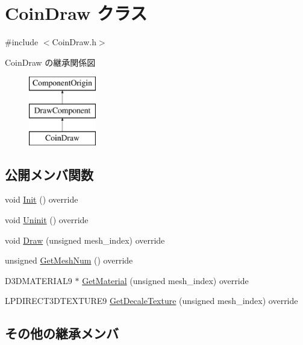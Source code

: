 \hypertarget{class_coin_draw}{}\section{Coin\+Draw クラス}
\label{class_coin_draw}


{\ttfamily \#include $<$Coin\+Draw.\+h$>$}

Coin\+Draw の継承関係図\begin{figure}[H]
\begin{center}
\leavevmode
\includegraphics[height=3.000000cm]{class_coin_draw}
\end{center}
\end{figure}
\subsection*{公開メンバ関数}
\begin{DoxyCompactItemize}
\item 
void \mbox{\hyperlink{class_coin_draw_ad0f5da5cfb896541fd59b1ab4a8593d1}{Init}} () override
\item 
void \mbox{\hyperlink{class_coin_draw_a6484c22a5598e298f18e7cd6083cd551}{Uninit}} () override
\item 
void \mbox{\hyperlink{class_coin_draw_a57e3f327324db9ec3debc702d14325c7}{Draw}} (unsigned mesh\+\_\+index) override
\item 
unsigned \mbox{\hyperlink{class_coin_draw_a9f5aa847fcb28e5617f00d575a6a911c}{Get\+Mesh\+Num}} () override
\item 
D3\+D\+M\+A\+T\+E\+R\+I\+A\+L9 $\ast$ \mbox{\hyperlink{class_coin_draw_a4582370e7ec4c1259b2a91cc185fbe09}{Get\+Material}} (unsigned mesh\+\_\+index) override
\item 
L\+P\+D\+I\+R\+E\+C\+T3\+D\+T\+E\+X\+T\+U\+R\+E9 \mbox{\hyperlink{class_coin_draw_aa3132d69a3dd903e79331b3c4b46ab79}{Get\+Decale\+Texture}} (unsigned mesh\+\_\+index) override
\end{DoxyCompactItemize}
\subsection*{その他の継承メンバ}


